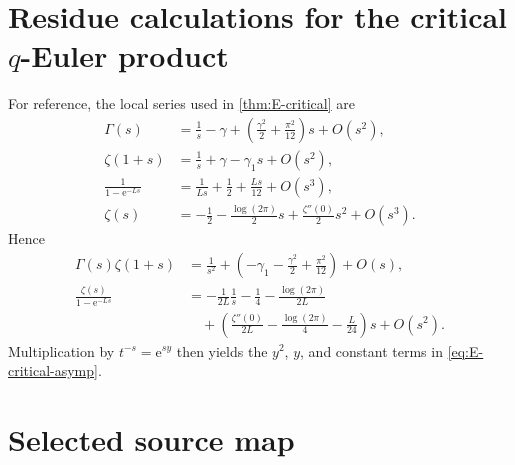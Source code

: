 \documentclass[11pt,oneside]{article}
\numberwithin{equation}{section}
\theoremstyle{plain}
\theoremstyle{definition}
\theoremstyle{remark}
\newcommand{\e}{\mathrm e}
\begin{document}
\endgroup

\section{Residue calculations for the critical $q$-Euler product}\label{app:residues}

For reference, the local series used in \cref{thm:E-critical} are
\begin{align*}
 \Gamma(s)&=\frac1s-\gamma+
 \left(\frac{\gamma^2}{2}+\frac{\pi^2}{12}\right)s+O(s^2),\\
 \zeta(1+s)&=\frac1s+\gamma-\gamma_1s+O(s^2),\\
 \frac1{1-\e^{-Ls}}&=\frac1{Ls}+\frac12+\frac{Ls}{12}+O(s^3),\\
 \zeta(s)&=-\frac12-\frac{\log(2\pi)}2s+\frac{\zeta''(0)}2s^2+O(s^3).
\end{align*}
Hence
\begin{align*}
 \Gamma(s)\zeta(1+s)
 &=\frac1{s^2}+
 \left(-\gamma_1-\frac{\gamma^2}{2}+\frac{\pi^2}{12}\right)+O(s),\\
 \frac{\zeta(s)}{1-\e^{-Ls}}
 &=-\frac1{2L}\frac1s
 -\frac14-\frac{\log(2\pi)}{2L}\\
 &\quad+
 \left(\frac{\zeta''(0)}{2L}
 -\frac{\log(2\pi)}4-\frac L{24}\right)s+O(s^2).
\end{align*}
Multiplication by $t^{-s}=\e^{sy}$ then yields the $y^2$, $y$, and constant terms in \cref{eq:E-critical-asymp}.

\section{Selected source map}
\end{document}
